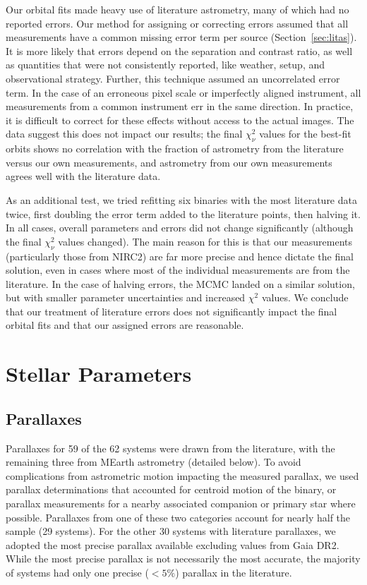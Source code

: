 \documentclass[twocolumn]{aastex62}
\begin{document}
Our orbital fits made heavy use of literature astrometry, many of which had no reported errors. Our method for assigning or correcting errors assumed that all measurements have a common missing error term per source (Section~\ref{sec:litas}). It is more likely that errors depend on the separation and contrast ratio, as well as quantities that were not consistently reported, like weather, setup, and observational strategy. Further, this technique assumed an uncorrelated error term. In the case of an erroneous pixel scale or imperfectly aligned instrument, all measurements from a common instrument err in the same direction. In practice, it is difficult to correct for these effects without access to the actual images. The data suggest this does not impact our results; the final $\chi^2_\nu$ values for the best-fit orbits shows no correlation with the fraction of astrometry from the literature versus our own measurements, and astrometry from our own measurements agrees well with the literature data. 

As an additional test, we tried refitting six binaries with the most literature data twice, first doubling the error term added to the literature points, then halving it. In all cases, overall parameters and errors did not change significantly (although the final $\chi^2_\nu$ values changed). The main reason for this is that our measurements (particularly those from NIRC2) are far more precise and hence dictate the final solution, even in cases where most of the individual measurements are from the literature. In the case of halving errors, the MCMC landed on a similar solution, but with smaller parameter uncertainties and increased $\chi^2$ values. We conclude that our treatment of literature errors does not significantly impact the final orbital fits and that our assigned errors are reasonable.

\section{Stellar Parameters}\label{sec:params}

\subsection{Parallaxes}\label{sec:plx}

Parallaxes for 59 of the 62 systems were drawn from the literature, with the remaining three from MEarth astrometry (detailed below). To avoid complications from astrometric motion impacting the measured parallax, we used parallax determinations that accounted for centroid motion of the binary, or parallax measurements for a nearby associated companion or primary star where possible. Parallaxes from one of these two categories account for nearly half the sample (29 systems). For the other 30 systems with literature parallaxes, we adopted the most precise parallax available excluding values from Gaia DR2. While the most precise parallax is not necessarily the most accurate, the majority of systems had only one precise ($<5\%$) parallax in the literature.
\end{document}
